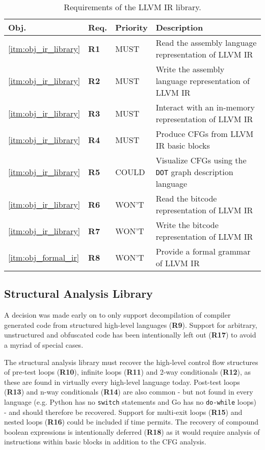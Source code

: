 \begin{table}[htbp]
	\begin{center}
		\begin{tabular}{|l|l|l|l|}
			\hline
			Obj. & Req. & Priority & Description \\
			\hline
			\ref{itm:obj_ir_library} & \textbf{R1} & MUST & Read the assembly language representation of LLVM IR \\
			\ref{itm:obj_ir_library} & \textbf{R2} & MUST & Write the assembly language representation of LLVM IR \\
			\ref{itm:obj_ir_library} & \textbf{R3} & MUST & Interact with an in-memory representation of LLVM IR \\
			\ref{itm:obj_ir_library} & \textbf{R4} & MUST & Produce CFGs from LLVM IR basic blocks \\
			\ref{itm:obj_ir_library} & \textbf{R5} & COULD & Visualize CFGs using the \texttt{DOT} graph description language \\
			\ref{itm:obj_ir_library} & \textbf{R6} & WON'T & Read the bitcode representation of LLVM IR \\
			\ref{itm:obj_ir_library} & \textbf{R7} & WON'T & Write the bitcode representation of LLVM IR \\
			\ref{itm:obj_formal_ir} & \textbf{R8} & WON'T & Provide a formal grammar of LLVM IR \\
			\hline
		\end{tabular}
	\end{center}
	\caption{Requirements of the LLVM IR library.}
\end{table}


\subsection{Structural Analysis Library}

A decision was made early on to only support decompilation of compiler generated code from structured high-level languages (\textbf{R9}). Support for arbitrary, unstructured and obfuscated code has been intentionally left out (\textbf{R17}) to avoid a myriad of special cases.

The structural analysis library must recover the high-level control flow structures of pre-test loops (\textbf{R10}), infinite loops (\textbf{R11}) and 2-way conditionals (\textbf{R12}), as these are found in virtually every high-level language today. Post-test loops (\textbf{R13}) and n-way conditionals (\textbf{R14}) are also common - but not found in every language (e.g. Python has no \texttt{switch} statements and Go has no \texttt{do-while} loops) - and should therefore be recovered. Support for multi-exit loops (\textbf{R15}) and nested loops (\textbf{R16}) could be included if time permits. The recovery of compound boolean expressions is intentionally deferred (\textbf{R18}) as it would require analysis of instructions within basic blocks in addition to the CFG analysis.

